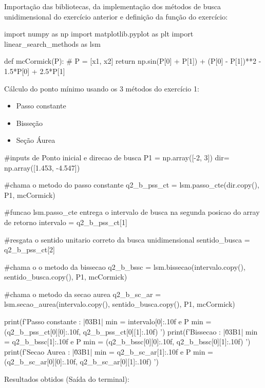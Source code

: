 \documentclass[10pt, a4paper]{article}
\begin{document}
Importação das bibliotecas, da implementação dos métodos de busca unidimensional do exercício anterior e
definição da função do exercício:

\begin{python}
  import numpy as np
  import matplotlib.pyplot as plt
  import linear_search_methods as lsm

  def mcCormick(P):
    # P = [x1, x2]
    return np.sin(P[0] + P[1]) + (P[0] - P[1])**2 - 1.5*P[0] + 2.5*P[1]
\end{python}

  Cálculo do ponto mínimo usando os 3 métodos do exercício 1:

\begin{itemize}
  \item Passo constante
  \item Bisseção
  \item Seção Áurea
\end{itemize}

\begin{python}

  #inputs de Ponto inicial e direcao de busca
  P1 = np.array([-2, 3])
  dir= np.array([1.453, -4.547])

  #chama o metodo do passo constante
  q2_b_pss_ct = lsm.passo_cte(dir.copy(), P1, mcCormick)

  #funcao lsm.passo_cte entrega o intervalo de busca na segunda posicao do array de retorno
  intervalo = q2_b_pss_ct[1]

  #resgata o sentido unitario correto da busca unidimensional
  sentido_busca = q2_b_pss_ct[2]

  #chama o o metodo da bissecao
  q2_b_bssc = lsm.bissecao(intervalo.copy(), sentido_busca.copy(), P1, mcCormick)

  #chama o metodo da secao aurea
  q2_b_sc_ar = lsm.secao_aurea(intervalo.copy(), sentido_busca.copy(), P1, mcCormick)

  print(f'Passo constante : |\u03B1| min = {intervalo[0]:.10f} e P min = ({q2_b_pss_ct[0][0]:.10f}, {q2_b_pss_ct[0][1]:.10f}) ')
  print(f'Bissecao        : |\u03B1| min = {q2_b_bssc[1]:.10f} e P min = ({q2_b_bssc[0][0]:.10f}, {q2_b_bssc[0][1]:.10f}) ')
  print(f'Secao Aurea     : |\u03B1| min = {q2_b_sc_ar[1]:.10f} e P min = ({q2_b_sc_ar[0][0]:.10f}, {q2_b_sc_ar[0][1]:.10f}) ')

\end{python}

Resultados obtidos (Saída do terminal):
\newline
\end{document}
